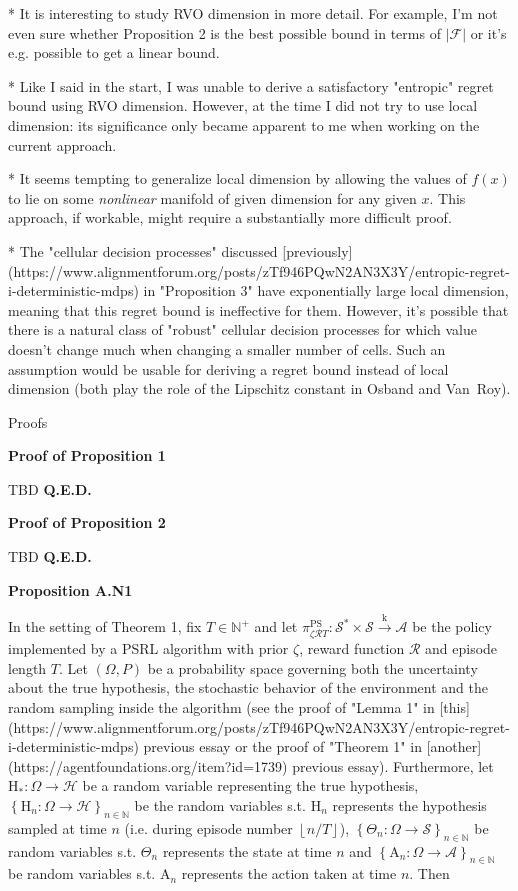 \documentclass[a4paper]{article}
\newcommand{\Co}[1]{}
\newcommand{\AC}[1]{\left\{#1\right\}}
\newcommand{\Nats}{\mathbb{N}}
\newcommand{\Abs}[1]{\left\vert #1 \right\vert}
\newcommand{\Floor}[1]{\left\lfloor #1 \right\rfloor}
\newcommand{\K}{\xrightarrow{\mathrm{k}}}
\newcommand{\F}{\mathcal{F}}
\newcommand{\St}{\mathcal{S}}
\newcommand{\A}{\mathcal{A}}
\newcommand{\R}{\mathcal{R}}
\newcommand{\Hy}{\mathcal{H}}
\newcommand{\PSR}{\text{PS}}
\newcommand{\AT}{\mathrm{A}}
\newcommand{\THy}{\mathrm{H}_*}
\newcommand{\SHy}{\mathrm{H}}
\begin{document}
* It is interesting to study RVO dimension in more detail. For example, I'm not even sure whether Proposition 2 is the best possible bound in terms of $\Abs{\F}$ or it's e.g. possible to get a linear bound.

* Like I said in the start, I was unable to derive a satisfactory "entropic" regret bound using RVO dimension. However, at the time I did not try to use local dimension: its significance only became apparent to me when working on the current approach.

* It seems tempting to generalize local dimension by allowing the values of $f(x)$ to lie on some \textit{nonlinear} manifold of given dimension for any given $x$. This approach, if workable, might require a substantially more difficult proof.

* The "cellular decision processes" discussed [previously](https://www.alignmentforum.org/posts/zTf946PQwN2AN3X3Y/entropic-regret-i-deterministic-mdps) in "Proposition 3" have exponentially large local dimension, meaning that this regret bound is ineffective for them. However, it's possible that there is a natural class of "robust" cellular decision processes for which value doesn't change much when changing a smaller number of cells. Such an assumption would be usable for deriving a regret bound instead of local dimension (both play the role of the Lipschitz constant in Osband and Van\ Roy).

\begin{Huge}Proofs\end{Huge}

\textbf{Proof of Proposition 1}\Co{b}

TBD \textbf{Q.E.D.}\Co{b}

\textbf{Proof of Proposition 2}\Co{b}

TBD \textbf{Q.E.D.}\Co{b} %

\textbf{Proposition A.N1}\Co{b}

In the setting of Theorem 1, fix $T\in\Nats^+$ and let $\pi_{\zeta\R T}^{\PSR}: \St^*\times\St\K\A$ be the policy implemented by a PSRL algorithm with prior $\zeta$, reward function $\R$ and episode length $T$. Let $(\Omega,P)$ be a probability space governing both the uncertainty about the true hypothesis, the stochastic behavior of the environment and the random sampling inside the algorithm (see the proof of "Lemma 1" in [this](https://www.alignmentforum.org/posts/zTf946PQwN2AN3X3Y/entropic-regret-i-deterministic-mdps) previous essay or the proof of "Theorem 1" in [another](https://agentfoundations.org/item?id=1739) previous essay). Furthermore, let $\THy:\Omega\rightarrow\Hy$ be a random variable representing the true hypothesis, $\AC{\SHy_n:\Omega\rightarrow\Hy}_{n\in\Nats}$ be the random variables s.t. $\SHy_n$ represents the hypothesis sampled at time $n$ (i.e. during episode number $\Floor{n/T}$), $\AC{\Theta_n:\Omega\rightarrow\St}_{n\in\Nats}$ be random variables s.t. $\Theta_n$ represents the state at time $n$ and $\AC{\AT_n:\Omega\rightarrow\A}_{n\in\Nats}$ be random variables s.t. $\AT_n$ represents the action taken at time $n$. Then
\end{document}
